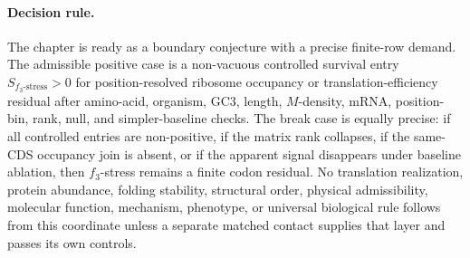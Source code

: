 \paragraph{Decision rule.}
The chapter is ready as a boundary conjecture with a precise finite-row demand.  The admissible positive case is a non-vacuous controlled survival entry $S_{f_3\text{-stress}}>0$ for position-resolved ribosome occupancy or translation-efficiency residual after amino-acid, organism, GC3, length, $M$-density, mRNA, position-bin, rank, null, and simpler-baseline checks.  The break case is equally precise: if all controlled entries are non-positive, if the matrix rank collapses, if the same-CDS occupancy join is absent, or if the apparent signal disappears under baseline ablation, then $f_3$-stress remains a finite codon residual.  No translation realization, protein abundance, folding stability, structural order, physical admissibility, molecular function, mechanism, phenotype, or universal biological rule follows from this coordinate unless a separate matched contact supplies that layer and passes its own controls.

